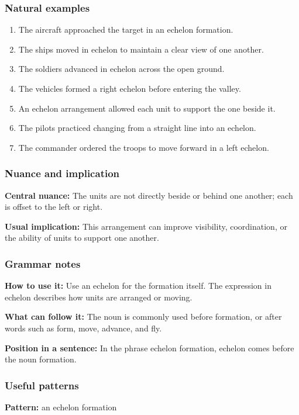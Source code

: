 \documentclass[11pt]{article}
\begin{document}
\subsubsection{Natural examples}
\begin{enumerate}
  \item The aircraft approached the target in an echelon formation.
  \item The ships moved in echelon to maintain a clear view of one another.
  \item The soldiers advanced in echelon across the open ground.
  \item The vehicles formed a right echelon before entering the valley.
  \item An echelon arrangement allowed each unit to support the one beside it.
  \item The pilots practiced changing from a straight line into an echelon.
  \item The commander ordered the troops to move forward in a left echelon.
\end{enumerate}

\subsubsection{Nuance and implication}
\textbf{Central nuance:} The units are not directly beside or behind one another; each is offset to the left or right.

\textbf{Usual implication:} This arrangement can improve visibility, coordination, or the ability of units to support one another.

\subsubsection{Grammar notes}
\textbf{How to use it:} Use an echelon for the formation itself. The expression in echelon describes how units are arranged or moving.

\textbf{What can follow it:} The noun is commonly used before formation, or after words such as form, move, advance, and fly.

\textbf{Position in a sentence:} In the phrase echelon formation, echelon comes before the noun formation.

\subsubsection{Useful patterns}
\textbf{Pattern:} an echelon formation
\end{document}
